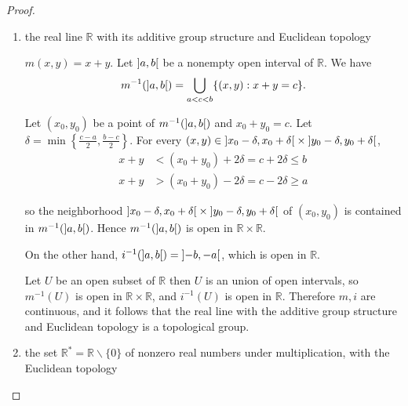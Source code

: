 \begin{proof}
    \begin{enumerate}[label={(\alph*)}]
        \item the real line $\mathbb{R}$ with its additive group structure and Euclidean topology

              $m(x, y) = x + y$. Let $\left]{a, b}\right[$ be a nonempty open interval of $\mathbb{R}$. We have
              \[
                  m^{-1}(\left]{a,b}\right[) = \bigcup_{a < c < b}\{ (x, y): x + y = c \}.
              \]

              Let $(x_{0}, y_{0})$ be a point of $m^{-1}(\left]{a,b}\right[)$ and $x_{0} + y_{0} = c$. Let $\delta = \min\left\{ \frac{c-a}{2}, \frac{b-c}{2} \right\}$. For every $(x, y)\in \left]{x_{0} - \delta, x_{0} + \delta}\right[\times\left]{y_{0} - \delta, y_{0} + \delta}\right[$,
              \begin{align*}
                  x + y & < (x_{0} + y_{0}) + 2\delta = c + 2\delta \leq b \\
                  x + y & > (x_{0} + y_{0}) - 2\delta = c - 2\delta \geq a
              \end{align*}

              so the neighborhood $\left]{x_{0} - \delta, x_{0} + \delta}\right[\times\left]{y_{0} - \delta, y_{0} + \delta}\right[$ of $(x_{0}, y_{0})$ is contained in $m^{-1}(\left]{a, b}\right[)$. Hence $m^{-1}(\left]{a, b}\right[)$ is open in $\mathbb{R}\times\mathbb{R}$.

              On the other hand, $i^{-1}(\left]{a, b}\right[) = \left]{-b, -a}\right[$, which is open in $\mathbb{R}$.

              Let $U$ be an open subset of $\mathbb{R}$ then $U$ is an union of open intervals, so $m^{-1}(U)$ is open in $\mathbb{R}\times\mathbb{R}$, and $i^{-1}(U)$ is open in $\mathbb{R}$. Therefore $m, i$ are continuous, and it follows that the real line with the additive group structure and Euclidean topology is a topological group.
        \item the set $\mathbb{R}^{*} = \mathbb{R}\smallsetminus\{0\}$ of nonzero real numbers under multiplication, with the Euclidean topology


\end{enumerate}
\end{proof}
